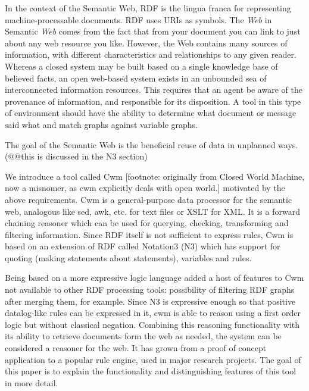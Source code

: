 \documentclass{tlp}
\begin{document}
\par In the context of the Semantic Web, RDF is the lingua franca for
representing machine-processable documents. RDF uses URIs as
symbols. The {\it Web} in Semantic {\it Web} comes from the fact
that from your document you can link to just about any web resource
you like. However, the Web contains many sources of information,
with different characteristics and relationships to any given
reader. Whereas a closed system may be built based on a single
knowledge base of believed facts, an open web-based system exists
in an unbounded sea of interconnected information resources. This
requires that an agent be aware of the provenance of information,
and responsible for its disposition. A tool in this type of
environment should have the ability to determine what document or
message said what and match graphs against variable graphs.

\par The goal of the Semantic Web is the beneficial reuse of data in
unplanned ways. (@@this is discussed in the N3 section)

\par We introduce a tool called Cwm [footnote: originally from Closed
World Machine, now a misnomer, as cwm explicitly deals with open
world.] motivated by the above requirements. Cwm is a
general-purpose data processor for the semantic web, analogous like
sed, awk, etc. for text files or XSLT for XML. It is a forward
chaining reasoner which can be used for querying, checking,
transforming and filtering information. Since RDF itself is not
sufficient to express rules, Cwm is based on an extension of RDF
called Notation3 (N3) which has support for quoting (making
statements about statements), variables and rules.

\par Being based on a more expressive logic language added a host of
features to Cwm not available to other RDF processing tools:
possibility of filtering RDF graphs after merging them, for
example. Since N3 is expressive enough so that positive
datalog-like rules can be expressed in it, cwm is able to reason
using a first order logic but without classical negation. Combining
this reasoning functionality with its ability to retrieve documents
form the web as needed, the system can be considered a reasoner for
the web. It has grown from a proof of concept application to a
popular rule engine, used in major research projects. The goal of
this paper is to explain the functionality and distinguishing
features of this tool in more detail.
\end{document}
